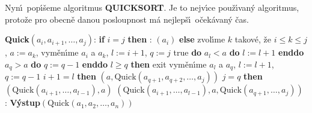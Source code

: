 \flushpar Nyn\'\i\ pop\'\i\v seme algoritmus {\bf QUICKSORT}. Je to 
nejv\'\i ce pou\-\v z\'\i van\'y algoritmus, proto\v ze pro obecn\v e danou 
posloupnost m\'a nejlep\v s\'\i\ o\v cek\'avan\'y \v cas. 
\bigskip

{\bf Quick$(a_i,a_{i+1},\dots,a_j)$}:\newline 
{\bf if} $i=j$ {\bf then}\newline 
\phantom{---}{\bf V\'ystup}: $(a_i)$\newline 
{\bf else}\newline 
\phantom{---}zvol\'\i me $k$ takov\'e, \v ze $i\le k\le j$, $a:=a_k$,\newline 
\phantom{---}vym\v en\'\i me $a_i$ a $a_k$, $l:=i+1$, $q:=j$\newline 
\phantom{---}{\bf while} true {\bf do}\newline 
\phantom{------}{\bf while} $a_l<a$ {\bf do} $l:=l+1$ {\bf enddo}\newline 
\phantom{------}{\bf while} $a_q>a$ {\bf do} $q:=q-1$ {\bf enddo}\newline
\phantom{------}{\bf if} $l\ge q$ {\bf then}\newline 
\phantom{---------}exit\newline 
\phantom{------}{\bf else}\newline 
\phantom{---------}vym\v en\'\i me $a_l$ a $a_q$, $l:=l+1$, $q:=q-1$\newline 
\phantom{------}{\bf endif}\newline
\phantom{---}{\bf enddo}\newline 
\phantom{---}{\bf if} $i+1=l$ {\bf then}\newline 
\phantom{------}{\bf V\'ystup}$(a,\text{Quick}(a_{q+1},a_{q+2},\dots,a_j))$\newline
\phantom{---}{\bf else}\newline 
\phantom{------}{\bf if} $j=q$ {\bf then}\newline 
\phantom{---------}{\bf V\'ystup}$(\text{Quick}(a_{i+1},\dots,a_{l-1}),a)$\newline \phantom{------}{\bf else}\newline 
\phantom{---------}{\bf V\'ystup}$(\text{Quick}(a_{i+1},\dots,a_{l-1}),a,\text{Quick}(a_{q+1},\dots,a_j))$\newline 
\phantom{------}{\bf endif}\newline 
\phantom{---}{\bf endif\newline 
endif
\bigskip

QUICKSORT$(a_1,a_2,\dots,a_n)$}:\newline 
{\bf V\'ystup}$(\text{Quick}(a_1,a_2,\dots,a_n))$
\bigskip

